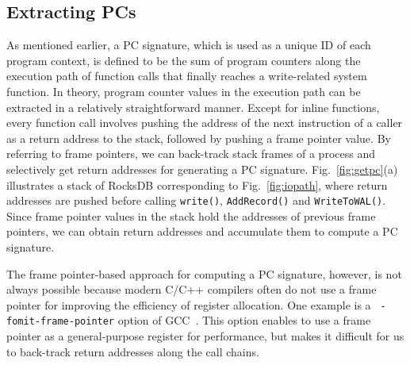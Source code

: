 \subsection{Extracting PCs}
\vspace{-5pt}
As mentioned earlier, a PC signature, which is used as a unique ID of each
program context, is defined to be the sum of program counters along the
execution path of function calls that finally reaches a write-related system
function.  In theory, program counter values in the execution path can be
extracted in a relatively straightforward manner.  Except for inline functions,
every function call involves pushing the address of the next instruction of a
caller as a return address to the stack, followed by pushing a frame pointer
value.  By referring to frame pointers, we can back-track stack frames of a
process and selectively get return addresses for generating a PC signature.
Fig.~\ref{fig:getpc}(a) illustrates a stack of RocksDB corresponding to
Fig.~\ref{fig:iopath}, where return addresses are pushed before calling
\texttt{write()}, \texttt{AddRecord()} and \texttt{WriteToWAL()}.  Since frame
pointer values in the stack hold the addresses of previous frame pointers, we
can obtain return addresses and accumulate them to compute a PC signature.  


The frame pointer-based approach for computing a PC signature, however, is not
always possible because modern C/C++ compilers often do not use a frame pointer
for improving the efficiency of register allocation.  One example is a {\tt
-fomit-frame-pointer} option of GCC~\cite{GCC}.  This option enables to use a frame
pointer as a general-purpose register for performance, but makes it difficult for us
to back-track return addresses along the call chains.  

